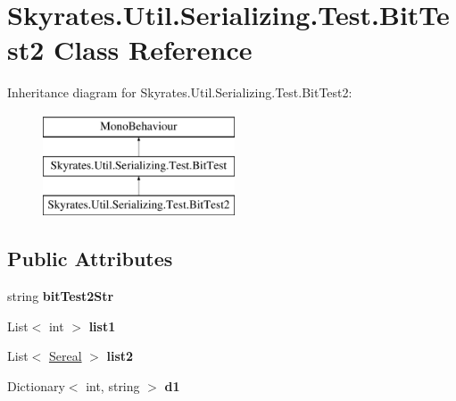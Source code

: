 \hypertarget{class_skyrates_1_1_util_1_1_serializing_1_1_test_1_1_bit_test2}{\section{Skyrates.\-Util.\-Serializing.\-Test.\-Bit\-Test2 Class Reference}
\label{class_skyrates_1_1_util_1_1_serializing_1_1_test_1_1_bit_test2}
}
Inheritance diagram for Skyrates.\-Util.\-Serializing.\-Test.\-Bit\-Test2\-:\begin{figure}[H]
\begin{center}
\leavevmode
\includegraphics[height=3.000000cm]{class_skyrates_1_1_util_1_1_serializing_1_1_test_1_1_bit_test2}
\end{center}
\end{figure}
\subsection*{Public Attributes}
\begin{DoxyCompactItemize}
\item 
\hypertarget{class_skyrates_1_1_util_1_1_serializing_1_1_test_1_1_bit_test2_ac40fd9f3ef77816954b39270a6f4e02f}{string {\bfseries bit\-Test2\-Str}}\label{class_skyrates_1_1_util_1_1_serializing_1_1_test_1_1_bit_test2_ac40fd9f3ef77816954b39270a6f4e02f}

\item 
\hypertarget{class_skyrates_1_1_util_1_1_serializing_1_1_test_1_1_bit_test2_a9342bd50f7700a529bd76f1cbbb11a68}{List$<$ int $>$ {\bfseries list1}}\label{class_skyrates_1_1_util_1_1_serializing_1_1_test_1_1_bit_test2_a9342bd50f7700a529bd76f1cbbb11a68}

\item 
\hypertarget{class_skyrates_1_1_util_1_1_serializing_1_1_test_1_1_bit_test2_ab01ad82a8f8391cf250e75a8d8d7a607}{List$<$ \hyperlink{class_skyrates_1_1_util_1_1_serializing_1_1_test_1_1_bit_test_1_1_sereal}{Sereal} $>$ {\bfseries list2}}\label{class_skyrates_1_1_util_1_1_serializing_1_1_test_1_1_bit_test2_ab01ad82a8f8391cf250e75a8d8d7a607}

\item 
\hypertarget{class_skyrates_1_1_util_1_1_serializing_1_1_test_1_1_bit_test2_aa1a09aca571209f478538eedce9d13ec}{Dictionary$<$ int, string $>$ {\bfseries d1}}\label{class_skyrates_1_1_util_1_1_serializing_1_1_test_1_1_bit_test2_aa1a09aca571209f478538eedce9d13ec}

\end{DoxyCompactItemize}
